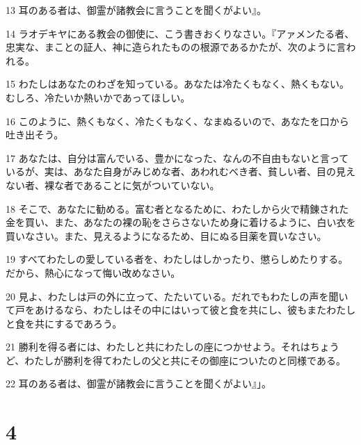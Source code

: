 \par 13 耳のある者は、御霊が諸教会に言うことを聞くがよい』。
\par 14 ラオデキヤにある教会の御使に、こう書きおくりなさい。『アァメンたる者、忠実な、まことの証人、神に造られたものの根源であるかたが、次のように言われる。
\par 15 わたしはあなたのわざを知っている。あなたは冷たくもなく、熱くもない。むしろ、冷たいか熱いかであってほしい。
\par 16 このように、熱くもなく、冷たくもなく、なまぬるいので、あなたを口から吐き出そう。
\par 17 あなたは、自分は富んでいる、豊かになった、なんの不自由もないと言っているが、実は、あなた自身がみじめな者、あわれむべき者、貧しい者、目の見えない者、裸な者であることに気がついていない。
\par 18 そこで、あなたに勧める。富む者となるために、わたしから火で精錬された金を買い、また、あなたの裸の恥をさらさないため身に着けるように、白い衣を買いなさい。また、見えるようになるため、目にぬる目薬を買いなさい。
\par 19 すべてわたしの愛している者を、わたしはしかったり、懲らしめたりする。だから、熱心になって悔い改めなさい。
\par 20 見よ、わたしは戸の外に立って、たたいている。だれでもわたしの声を聞いて戸をあけるなら、わたしはその中にはいって彼と食を共にし、彼もまたわたしと食を共にするであろう。
\par 21 勝利を得る者には、わたしと共にわたしの座につかせよう。それはちょうど、わたしが勝利を得てわたしの父と共にその御座についたのと同様である。
\par 22 耳のある者は、御霊が諸教会に言うことを聞くがよい』」。

\chapter{4}

